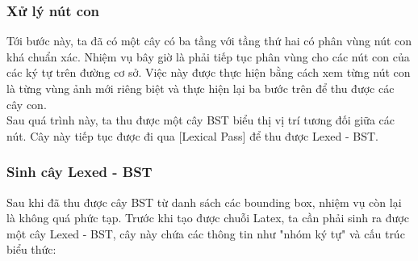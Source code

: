 \documentclass[a4paper,12pt]{article}
\begin{document}

	
	\subsubsection*{Xử lý nút con}
	
	Tới bước này, ta đã có một cây có ba tầng với tầng thứ hai có phân vùng nút con khá chuẩn xác. Nhiệm vụ bây giờ là phải tiếp tục phân vùng cho các nút con của các ký tự trên đường cơ sở. Việc này được thực hiện bằng cách xem từng nút con là từng vùng ảnh mới riêng biệt và thực hiện lại ba bước trên để thu được các cây con. \\
	
	Sau quá trình này, ta thu được một cây BST biểu thị vị trí tương đối giữa các nút. Cây này tiếp tục được đi qua [Lexical Pass] để thu được Lexed - BST\cite{zanibbi}.
	
	\subsubsection{Sinh cây Lexed - BST\cite{zanibbi}}
	
	Sau khi đã thu được cây BST từ danh sách các bounding box, nhiệm vụ còn lại là không quá phức tạp. Trước khi tạo được chuỗi Latex, ta cần phải sinh ra được một cây Lexed - BST\cite{zanibbi}, cây này chứa các thông tin như "nhóm ký tự" và cấu trúc biểu thức:
	
\end{document}
